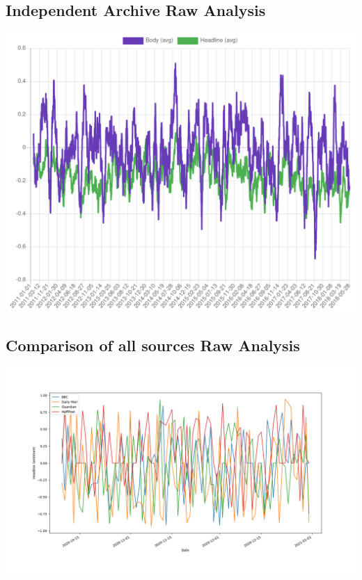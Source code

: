 \documentclass[12pt,a4paper]{article}
\begin{document}
\begin{appendices}
\begin{subappendices}
\subsection{Independent Archive Raw Analysis} \label{app:vis-ind-raw}
\includegraphics[width=\linewidth]{../visualisation/ind-raw.png}

\subsection{Comparison of all sources Raw Analysis} \label{app:vis-all-raw}
\includegraphics[width=\linewidth]{../visualisation/comparison-raw.png}

\end{subappendices}

\end{appendices}
\end{document}
